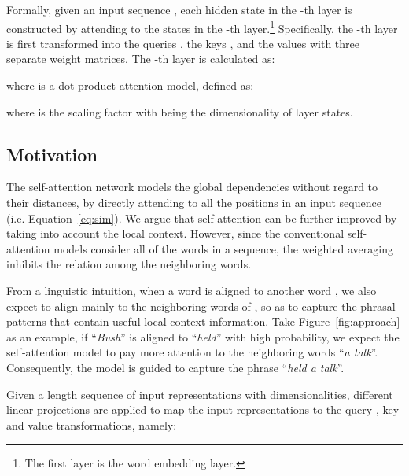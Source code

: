 \documentclass[11pt,a4paper]{article}
\begin{document}
Formally, given an input sequence , each hidden state in the -th layer is constructed by attending to the states in the -th layer.\footnote{The first layer is the word embedding layer.}
Specifically, the -th layer  is first transformed into the queries , the keys , and the values  with three separate weight matrices. The -th layer is calculated as:

where  is a dot-product attention model, defined as:

where  is the scaling factor with  being the dimensionality of layer states.



\subsection{Motivation}
\iffalse
\begin{figure}[t]
\begin{center}
\texttt{[image: figures/self-attention.pdf]}
\caption{
\label{fig:self-attention}
Illustration of self-attention networks.
}
\end{center}
\end{figure}
\fi
The self-attention network models the global dependencies without regard to their distances, by directly attending to all the positions in an input sequence (i.e. Equation~\ref{eq:sim}).
We argue that self-attention can be further improved by taking into account the local context.
However, since the conventional self-attention models consider all of the words in a sequence, the weighted averaging inhibits the relation among the neighboring words.

From a linguistic intuition, when a word  is aligned to another word , we also expect  to align mainly to the neighboring words of , so as to capture the phrasal patterns that contain useful local context information.
Take Figure~\ref{fig:approach} as an example, if ``{\em Bush}'' is aligned to ``{\em held}'' with high probability, we expect the self-attention model to pay more attention to the neighboring words ``{\em a talk}''. 
Consequently, the model is guided to capture the phrase ``{\em held a talk}''.






\iffalse


\pagebreak
Given a  length sequence of input representations  with  dimensionalities, different linear projections are applied to map the input representations  to the query , key  and value  transformations, namely:
\end{document}
